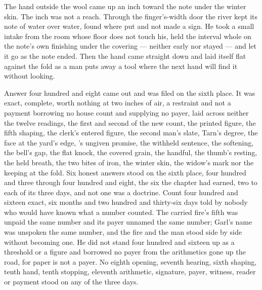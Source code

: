 The hand outside the wool came up an inch toward the note under the winter skin. The inch was not a reach. Through the finger's-width door the river kept its note of water over water, found where put and not made a sign. He took a small intake from the room whose floor does not touch his, held the interval whole on the note's own finishing under the covering --- neither early nor stayed --- and let it go as the note ended. Then the hand came straight down and laid itself flat against the fold as a man puts away a tool where the next hand will find it without looking.

Answer four hundred and eight came out and was filed on the sixth place. It was exact, complete, worth nothing at two inches of air, a restraint and not a payment borrowing no house count and supplying no payer, laid across neither the twelve readings, the first and second of the new count, the printed figure, the fifth shaping, the clerk's entered figure, the second man's slate, Tarn's degree, the face at the yard's edge, 's ungiven promise, the withheld sentence, the softening, the bell's gap, the flat knock, the covered grain, the handful, the thumb's resting, the held breath, the two bites of iron, the winter skin, the widow's mark nor the keeping at the fold. Six honest answers stood on the sixth place, four hundred and three through four hundred and eight, the six the chapter had earned, two to each of its three days, and not one was a doctrine. Count four hundred and sixteen exact, six months and two hundred and thirty-six days told by nobody who would have known what a number counted. The carried fire's fifth was unpaid the same number and its payer unnamed the same number; Garl's name was unspoken the same number, and the fire and the man stood side by side without becoming one. He did not stand four hundred and sixteen up as a threshold or a figure and borrowed no payer from the arithmetics gone up the road, for paper is not a payer. No eighth opening, seventh hearing, sixth shaping, tenth hand, tenth stopping, eleventh arithmetic, signature, payer, witness, reader or payment stood on any of the three days.

